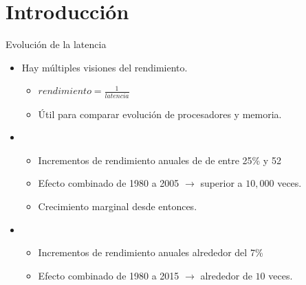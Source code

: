 \section{Introducción}

\begin{frame}[t]{Evolución de la latencia}
\begin{itemize}
  \item Hay múltiples visiones del rendimiento.
    \begin{itemize}
      \item $rendimiento = \frac{1}{latencia}$
      \item Útil para comparar evolución de procesadores y memoria.
    \end{itemize}

  \item {}
    \begin{itemize}
      \item Incrementos de rendimiento anuales de de entre 25\% y 52%
      \item Efecto combinado de 1980 a 2005 $\rightarrow$ superior a $10,000$ veces.
      \item Crecimiento marginal desde entonces.
    \end{itemize}

  \item {}
    \begin{itemize}
      \item Incrementos de rendimiento anuales alrededor del 7\%
      \item Efecto combinado de 1980 a 2015 $\rightarrow$ alrededor de $10$ veces.
    \end{itemize}
\end{itemize}
\end{frame}

